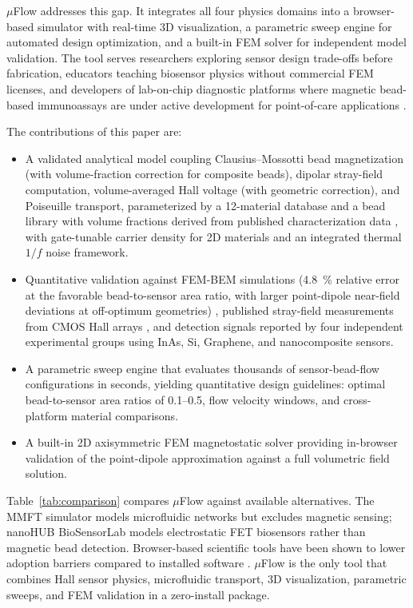 \documentclass[preprint,review,12pt]{elsarticle}
\begin{document}
$\mu$Flow addresses this gap. It integrates all four physics domains into a browser-based simulator with real-time 3D visualization, a parametric sweep engine for automated design optimization, and a built-in FEM solver for independent model validation. The tool serves researchers exploring sensor design trade-offs before fabrication, educators teaching biosensor physics without commercial FEM licenses, and developers of lab-on-chip diagnostic platforms where magnetic bead-based immunoassays are under active development for point-of-care applications \cite{tymm2020,coarsey2019,kabir2020,bhalla2013}.

The contributions of this paper are:
\begin{itemize}[nosep]
\item A validated analytical model coupling Clausius--Mossotti bead magnetization (with volume-fraction correction for composite beads), dipolar stray-field computation, volume-averaged Hall voltage (with geometric correction), and Poiseuille transport, parameterized by a 12-material database and a bead library with volume fractions derived from published characterization data \cite{fonnum2005}, with gate-tunable carrier density for 2D materials and an integrated thermal $1/f$ noise framework.
\item Quantitative validation against FEM-BEM simulations (\SI{4.8}{\percent} relative error at the favorable bead-to-sensor area ratio, with larger point-dipole near-field deviations at off-optimum geometries) \cite{govindaraju2025}, published stray-field measurements from CMOS Hall arrays \cite{gambini2013,besse2002}, and detection signals reported by four independent experimental groups using InAs, Si, Graphene, and nanocomposite sensors.
\item A parametric sweep engine that evaluates thousands of sensor-bead-flow configurations in seconds, yielding quantitative design guidelines: optimal bead-to-sensor area ratios of 0.1--0.5, flow velocity windows, and cross-platform material comparisons.
\item A built-in 2D axisymmetric FEM magnetostatic solver providing in-browser validation of the point-dipole approximation against a full volumetric field solution.
\end{itemize}

Table~\ref{tab:comparison} compares $\mu$Flow against available alternatives. The MMFT simulator \cite{emmerich2024} models microfluidic networks but excludes magnetic sensing; nanoHUB BioSensorLab \cite{nanohub} models electrostatic FET biosensors rather than magnetic bead detection. Browser-based scientific tools have been shown to lower adoption barriers compared to installed software \cite{stein2023,gurvich2022}. $\mu$Flow is the only tool that combines Hall sensor physics, microfluidic transport, 3D visualization, parametric sweeps, and FEM validation in a zero-install package.
\end{document}
